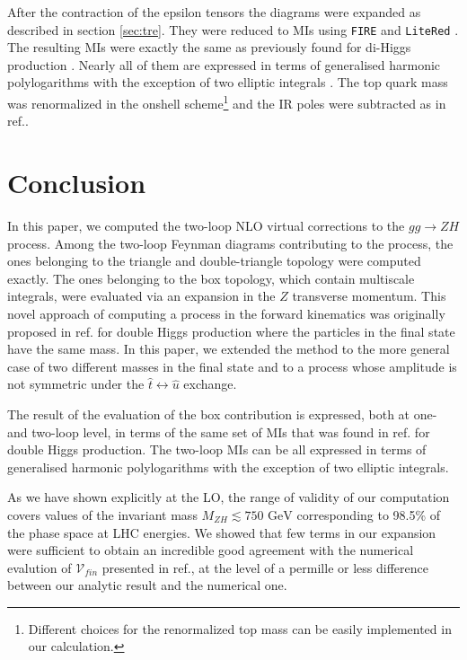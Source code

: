After the contraction of the epsilon tensors the diagrams were expanded as
described in section \ref{sec:tre}. They were reduced to MIs
using \texttt{FIRE} \cite{Smirnov:2014hma} and \texttt{LiteRed} \cite{Lee:2013mka}. The
resulting MIs were exactly the same as previously found for di-Higgs
production \cite{Bonciani:2018omm}. Nearly all of them are expressed
in terms of generalised harmonic polylogarithms with the exception of
two elliptic integrals \cite{vonManteuffel:2017hms, Bonciani:2018uvv}.
The top quark mass was renormalized in the onshell scheme\footnote{Different choices
	for the renormalized top mass can be easily implemented in our calculation.}
and the IR poles were subtracted as in ref.\cite{Degrassi:2016vss}.

\section{Conclusion \label{sec:conclusion}}
In this paper, we computed  the two-loop NLO virtual corrections to the 
$gg \to ZH$ process. Among the two-loop Feynman diagrams contributing
to the process,  the ones belonging to the triangle and
double-triangle topology were computed exactly. The ones  belonging 
to the box topology, which contain multiscale integrals, were evaluated via an
expansion in the $Z$ transverse momentum. This novel approach of
computing a process in the forward kinematics
was originally proposed in ref.\cite{Bonciani:2018omm} for
double Higgs production where the particles in the final state have
the same mass. In this paper,  we  extended
the method to the more general case of two different masses in the
final state and to a process whose amplitude is not symmetric
under the  $\hat{t}\leftrightarrow \hat{u}$ exchange.

The result of the evaluation of the box contribution is expressed,
both at one- and two-loop level, in terms of the
same set of MIs that was found in ref.\cite{Bonciani:2018omm} for
double Higgs production.  The two-loop MIs  can be all
expressed in terms of generalised harmonic polylogarithms with the
exception of two elliptic integrals.

As we have shown explicitly at the LO, the range of validity of our
computation covers values of the invariant mass
$M_{ZH}\lesssim 750\text{ GeV}$ corresponding to 98.5\% of the phase
space at LHC energies.  We showed that few terms in our
expansion were sufficient to obtain an incredible good agreement with the
numerical evalution of ${\mathcal V}_{fin}$ presented in ref.\cite{Chen:2020gae},
at the level of a permille or less difference between our analytic result and the numerical one.

